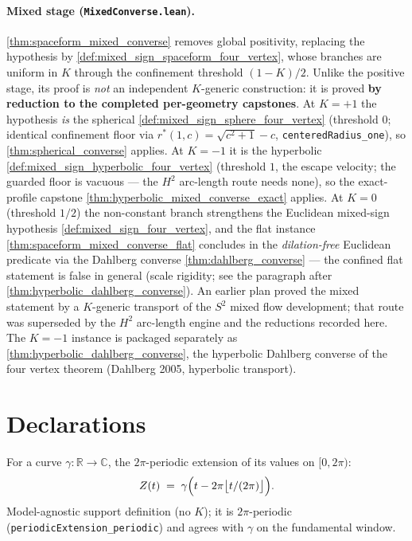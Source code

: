 \paragraph{Mixed stage (\texttt{MixedConverse.lean}).}
\cref{thm:spaceform_mixed_converse} removes global positivity, replacing the
hypothesis by \cref{def:mixed_sign_spaceform_four_vertex}, whose branches are
uniform in $K$ through the confinement threshold
$(1-K)/2$. Unlike the positive stage, its proof is \emph{not} an
independent $K$-generic construction: it is proved \textbf{by
reduction to the completed per-geometry capstones}. At $K=+1$ the
hypothesis \emph{is} the spherical \cref{def:mixed_sign_sphere_four_vertex}
(threshold $0$; identical confinement floor via
$r^\ast(1,c)=\sqrt{c^2+1}-c$, \texttt{centeredRadius\_one}), so
\cref{thm:spherical_converse} applies. At $K=-1$ it is the
hyperbolic \cref{def:mixed_sign_hyperbolic_four_vertex} (threshold $1$, the
escape velocity; the guarded floor is vacuous — the $H^2$ arc-length route
needs none), so the exact-profile capstone
\cref{thm:hyperbolic_mixed_converse_exact} applies. At $K=0$
(threshold $1/2$) the non-constant branch strengthens the Euclidean mixed-sign
hypothesis \cref{def:mixed_sign_four_vertex}, and the flat instance
\cref{thm:spaceform_mixed_converse_flat} concludes in the \emph{dilation-free}
Euclidean predicate via the Dahlberg converse \cref{thm:dahlberg_converse} —
the confined flat statement is false in general (scale rigidity; see the
paragraph after \cref{thm:hyperbolic_dahlberg_converse}). An earlier plan
proved the mixed statement by a $K$-generic transport of the $S^2$
mixed flow development; that route was superseded by the $H^2$ arc-length
engine and the reductions recorded here. The $K=-1$ instance is
packaged separately as \cref{thm:hyperbolic_dahlberg_converse}, the hyperbolic
Dahlberg converse of the four vertex theorem (Dahlberg 2005, hyperbolic
transport).

\section{Declarations}

\begin{definition}
  \label{def:spaceform_periodic_extension}
  For a curve $\gamma:\mathbb R\to\mathbb C$, the $2\pi$-periodic extension of its
  values on $[0,2\pi)$:
  \[
    Z(t)\;=\;\gamma\Bigl(t-2\pi\bigl\lfloor t/(2\pi)\bigr\rfloor\Bigr).
  \]
  Model-agnostic support definition (no $K$); it is $2\pi$-periodic
  (\texttt{periodicExtension\_periodic}) and agrees with $\gamma$ on the fundamental
  window.
\end{definition}

